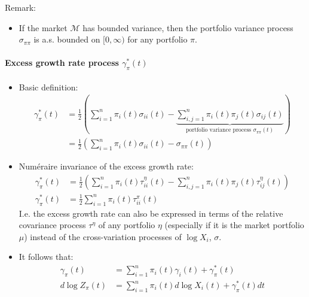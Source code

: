 \documentclass[a4paper,landscape,8pt,fleqn]{scrartcl}
\begin{document}
\begin{multicols*}{3}
Remark:
\begin{itemize}
\item If the market $\mathcal{M}$ has bounded variance, then the portfolio variance process $\sigma_{\pi \pi}$ is a.s. bounded on $[0,\infty)$ for any portfolio $\pi$.
\end{itemize}

\paragraph{Excess growth rate process $\gamma_\pi^\ast(t)$}

\begin{itemize}
\item Basic definition:
\begin{align*}
\gamma_\pi^\ast(t) &= \frac{1}{2} \left( \sum_{i=1}^n \pi_i(t) \sigma_{i i}(t) - \underbrace{\sum_{i,j=1}^n \pi_i(t) \pi_j(t) \sigma_{i j}(t)}\limits_{\text{portfolio variance process } \sigma_{\pi \pi}(t)} \right) \\
&= \frac{1}{2} \left( \sum_{i=1}^n \pi_i(t) \sigma_{i i}(t) - \sigma_{\pi \pi}(t) \right)
\end{align*}
\item Numéraire invariance of the excess growth rate:
\begin{align*}
\gamma_\pi^\ast(t) &= \frac{1}{2} \left( \sum_{i=1}^n \pi_i(t) \tau_{ii}^\eta(t) - \sum_{i,j=1}^n \pi_i(t) \pi_j(t) \tau_{i j}^\eta(t) \right) \\
\gamma_\pi^\ast(t) &= \frac{1}{2} \sum_{i=1}^n \pi_i(t) \tau_{ii}^\pi(t)
\end{align*}
I.e. the excess growth rate can also be expressed in terms of the relative covariance process $\tau^\eta$ of any portfolio $\eta$ (especially if it is the market portfolio $\mu$) instead of the cross-variation processes of $\log X_i$, $\sigma$.
\item It follows that:
\begin{align*}
\gamma_\pi(t) &= \sum_{i=1}^n \pi_i(t) \gamma_i(t) + \gamma_\pi^\ast (t) \\
d \log Z_\pi(t) &= \sum_{i=1}^n \pi_i(t) d\log X_i(t) + \gamma_\pi^\ast(t) dt
\end{align*}
\end{itemize}


\end{multicols*}
\end{document}
